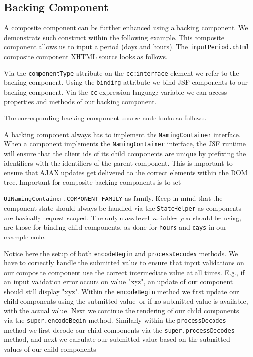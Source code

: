 \subsection{Backing Component}
A composite component can be further enhanced using a backing component.
We demonstrate such construct within the following example.
This composite component allows us to input a period (days and hours).
The \texttt{inputPeriod.xhtml} composite component XHTML source looks as follows.

Via the \texttt{componentType} attribute on the \texttt{cc:interface} element we refer to the backing component.
Using the \texttt{binding} attribute we bind JSF components to our backing component.
Via the \texttt{cc} expression language variable we can access properties and methods of our backing component.

The corresponding backing component source code looks as follows.

A backing component always has to implement the \texttt{NamingContainer} interface.
When a component implements the \texttt{NamingContainer} interface, the JSF runtime will ensure that the client ids of its child components are unique by prefixing the identifiers with the identifiers of the parent component.
This is important to ensure that AJAX updates get delivered to the correct elements within the DOM tree.
Important for composite backing components is to set 

\texttt{UINamingContainer.COMPONENT\_FAMILY} as family.
Keep in mind that the component state should always be handled via the \texttt{StateHelper} as components are basically request scoped.
The only class level variables you should be using, are those for binding child components, as done for \texttt{hours} and \texttt{days} in our example code.

Notice here the setup of both \texttt{encodeBegin} and \texttt{processDecodes} methods.
We have to correctly handle the submitted value to ensure that input validations on our composite component use the correct intermediate value at all times.
E.g., if an input validation error occurs on value "xyz", an update of our component should still display "xyz".
Within the \texttt{encodeBegin} method we first update our child components using the submitted value, or if no submitted value is available, with the actual value.
Next we continue the rendering of our child components via the \texttt{super.encodeBegin} method.
Similarly within the \texttt{processDecodes} method we first decode our child components via the \texttt{super.processDecodes} method, and next we calculate our submitted value based on the submitted values of our child components.


